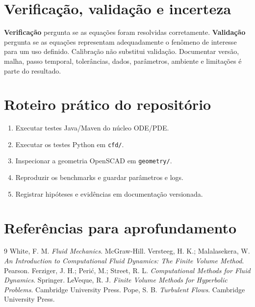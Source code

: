 \documentclass[11pt,a4paper,oneside]{book}
\begin{document}
\chapter{Verificação, validação e incerteza}
\textbf{Verificação} pergunta se as equações foram resolvidas corretamente. \textbf{Validação} pergunta se as equações representam adequadamente o fenômeno de interesse para um uso definido. Calibração não substitui validação. Documentar versão, malha, passo temporal, tolerâncias, dados, parâmetros, ambiente e limitações é parte do resultado.

\chapter{Roteiro prático do repositório}
\begin{enumerate}
\item Executar testes Java/Maven do núcleo ODE/PDE.
\item Executar os testes Python em \texttt{cfd/}.
\item Inspecionar a geometria OpenSCAD em \texttt{geometry/}.
\item Reproduzir os benchmarks e guardar parâmetros e logs.
\item Registrar hipóteses e evidências em documentação versionada.
\end{enumerate}
\backmatter
\chapter*{Referências para aprofundamento}
\begin{thebibliography}{9}
 White, F. M. \textit{Fluid Mechanics}. McGraw-Hill.
 Versteeg, H. K.; Malalasekera, W. \textit{An Introduction to Computational Fluid Dynamics: The Finite Volume Method}. Pearson.
 Ferziger, J. H.; Perić, M.; Street, R. L. \textit{Computational Methods for Fluid Dynamics}. Springer.
 LeVeque, R. J. \textit{Finite Volume Methods for Hyperbolic Problems}. Cambridge University Press.
 Pope, S. B. \textit{Turbulent Flows}. Cambridge University Press.
\end{thebibliography}
\end{document}
